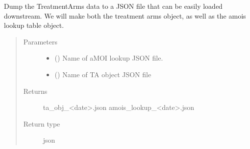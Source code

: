 \documentclass[letterpaper,10pt,english]{sphinxmanual}
\begin{document}
\begin{fulllineitems}
\begin{fulllineitems}
\label{\detokenize{matchbox_api_utils:matchbox_api_utils.match_arms.TreatmentArms.ta_json_dump}}
Dump the TreatmentArms data to a JSON file that can be easily loaded
downstream. We will make both the treatment arms object, as well as the
amois lookup table object.
\begin{quote}\begin{description}
\item[{Parameters}] \leavevmode\begin{itemize}
\item {} 
 () \textendash{} Name of aMOI lookup JSON file. 

\item {} 
 () \textendash{} Name of TA object JSON file 

\end{itemize}

\item[{Returns}] \leavevmode
ta\_obj\_\textless{}date\textgreater{}.json
amois\_lookup\_\textless{}date\textgreater{}.json

\item[{Return type}] \leavevmode
json

\end{description}\end{quote}

\end{fulllineitems}


\begin{fulllineitems}
\label{\detokenize{matchbox_api_utils:matchbox_api_utils.match_arms.TreatmentArms.make_match_arms_db}}


\end{fulllineitems}
\end{fulllineitems}
\end{document}
